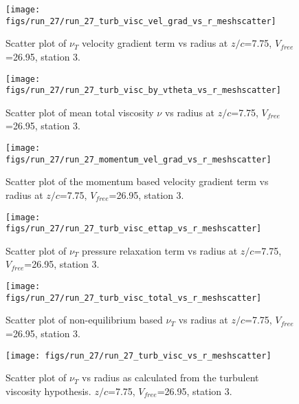 \begin{figure}[H]
\centering
\texttt{[image: figs/run\_27/run\_27\_turb\_visc\_vel\_grad\_vs\_r\_meshscatter]}
\caption{Scatter plot of $\nu_T$ velocity gradient term vs radius at $z/c$=7.75, $V_{free}$=26.95, station 3.}
\end{figure}


\begin{figure}[H]
\centering
\texttt{[image: figs/run\_27/run\_27\_turb\_visc\_by\_vtheta\_vs\_r\_meshscatter]}
\caption{Scatter plot of mean total viscosity $\nu$ vs radius at $z/c$=7.75, $V_{free}$=26.95, station 3.}
\end{figure}


\begin{figure}[H]
\centering
\texttt{[image: figs/run\_27/run\_27\_momentum\_vel\_grad\_vs\_r\_meshscatter]}
\caption{Scatter plot of the momentum based velocity gradient term vs radius at $z/c$=7.75, $V_{free}$=26.95, station 3.}
\end{figure}


\begin{figure}[H]
\centering
\texttt{[image: figs/run\_27/run\_27\_turb\_visc\_ettap\_vs\_r\_meshscatter]}
\caption{Scatter plot of $\nu_T$ pressure relaxation term vs radius at $z/c$=7.75, $V_{free}$=26.95, station 3.}
\end{figure}


\begin{figure}[H]
\centering
\texttt{[image: figs/run\_27/run\_27\_turb\_visc\_total\_vs\_r\_meshscatter]}
\caption{Scatter plot of non-equilibrium based $\nu_T$ vs radius at $z/c$=7.75, $V_{free}$=26.95, station 3.}
\end{figure}


\begin{figure}[H]
\centering
\texttt{[image: figs/run\_27/run\_27\_turb\_visc\_vs\_r\_meshscatter]}
\caption{Scatter plot of $\nu_T$ vs radius as calculated from the turbulent viscosity hypothesis. $z/c$=7.75, $V_{free}$=26.95, station 3.}
\end{figure}


